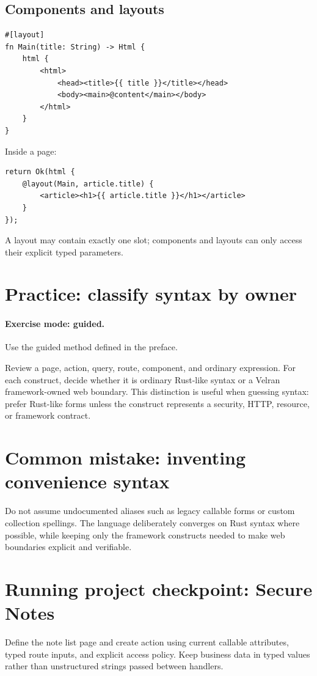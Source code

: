 \subsection*{Components and layouts}

\begin{lstlisting}[language=Velran]
#[layout]
fn Main(title: String) -> Html {
    html {
        <html>
            <head><title>{{ title }}</title></head>
            <body><main>@content</main></body>
        </html>
    }
}
\end{lstlisting}

Inside a page:

\begin{lstlisting}[language=Velran]
return Ok(html {
    @layout(Main, article.title) {
        <article><h1>{{ article.title }}</h1></article>
    }
});
\end{lstlisting}

A layout may contain exactly one  slot; components and layouts can only access their explicit typed parameters.

\section{Practice: classify syntax by owner}
\paragraph{Exercise mode: guided.} Use the guided method defined in the preface.

Review a page, action, query, route, component, and ordinary expression. For each construct, decide whether it is ordinary Rust-like syntax or a Velran framework-owned web boundary. This distinction is useful when guessing syntax: prefer Rust-like forms unless the construct represents a security, HTTP, resource, or framework contract.

\section{Common mistake: inventing convenience syntax}
Do not assume undocumented aliases such as legacy callable forms or custom collection spellings. The language deliberately converges on Rust syntax where possible, while keeping only the framework constructs needed to make web boundaries explicit and verifiable.

\section{Running project checkpoint: Secure Notes}
Define the note list page and create action using current callable attributes, typed route inputs, and explicit access policy. Keep business data in typed values rather than unstructured strings passed between handlers.
